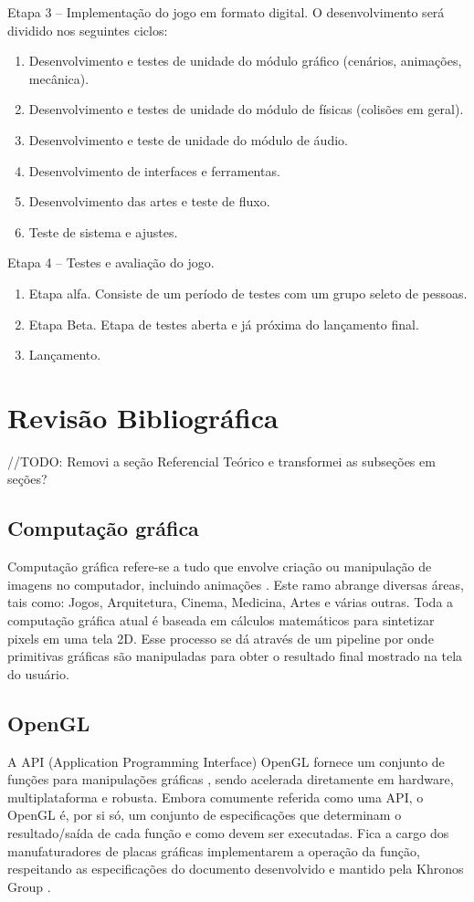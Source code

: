 \documentclass[12pt, 
openright, 
oneside, 
a4paper,    
brazil]{facom-ufu-abntex2}
\begin{document}
Etapa 3 – Implementação do jogo em formato digital. O desenvolvimento será dividido nos seguintes ciclos:
\begin{enumerate}
\item Desenvolvimento e testes de unidade do módulo gráfico
(cenários, animações, mecânica).
\item Desenvolvimento e testes de unidade do módulo de físicas
(colisões em geral).
\item Desenvolvimento e teste de unidade do módulo de áudio.
\item Desenvolvimento de interfaces e ferramentas.
\item Desenvolvimento das artes e teste de fluxo.
\item Teste de sistema e ajustes.
\end{enumerate}
Etapa 4 – Testes e avaliação do jogo.
\begin{enumerate}
\item Etapa alfa. Consiste de um período de testes com um grupo seleto de pessoas.
\item Etapa Beta. Etapa de testes aberta e já próxima do lançamento final.
\item Lançamento.
\end{enumerate}
\fi



\chapter{Revisão Bibliográfica}

//TODO: Removi a seção Referencial Teórico e transformei as subseções em seções?


\label{sec:refteo}
\section{Computação gráfica}
Computação gráfica refere-se a tudo que envolve criação ou manipulação de imagens no computador, incluindo animações \cite{ComputerGraphicsIntro}. Este ramo abrange diversas áreas, tais como: Jogos, Arquitetura, Cinema, Medicina, Artes e várias outras. Toda a computação gráfica atual é baseada em cálculos matemáticos para sintetizar pixels em uma tela 2D. Esse processo se dá através de um pipeline por onde primitivas gráficas são manipuladas para obter o resultado final mostrado na tela do usuário.
\section{OpenGL}
A API (Application Programming Interface) OpenGL fornece um conjunto de funções para manipulações gráficas \cite{LearnOpenGL}, sendo acelerada diretamente em hardware, multiplataforma e robusta. Embora comumente referida como uma API, o OpenGL é, por si só, um conjunto de especificações que determinam o resultado/saída de cada função e como devem ser executadas. Fica a cargo dos manufaturadores de placas gráficas implementarem a operação da função, respeitando as especificações do documento desenvolvido e mantido pela Khronos Group \cite{KhronosOpenGLSpecification}.
\end{document}
